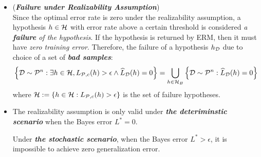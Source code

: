 \documentclass[11pt]{article}
\begin{document}
\begin{itemize}
\item \begin{remark} (\textbf{\emph{Failure under Realizability Assumption}})\\
Since the optimal error rate is zero under the realizability assumption, a hypothesis $h \in {\mathcal H}$ with error rate above a certain threshold is considered \emph{a \textbf{failure} of the hypothesis}. If the hypothesis is returned by ERM, then it must have \emph{zero training error}. Therefore, the failure of a hypothesis $h_{{\mathcal D}}$ due to choice of a set of \emph{\textbf{bad samples}}: 
\begin{align*}
\left\{{\mathcal D} \sim {\mathcal P}^{n}: \exists h \in {\mathcal H},   L_{{\mathcal P}, c}(h) > \epsilon \land \widehat{L}_{{\mathcal D}}(h) = 0\right\} = \bigcup_{h \in {\mathcal H}_B}\left\{{\mathcal D} \sim {\mathcal P}^{n}: \widehat{L}_{{\mathcal D}}(h) = 0\right\}
\end{align*} where ${\mathcal H} := \left\{h\in {\mathcal H}:  L_{{\mathcal P}, c}(h) > \epsilon\right\}$ is the set of failure hypotheses.
\end{remark}

\item \begin{remark}
The realizability assumption is only valid under \emph{\textbf{the deteriminstic scenario}} when the Bayes error $L^{*} = 0$.

Under \emph{\textbf{the stochastic scenario}}, when the Bayes error $L^{*} > \epsilon$, it is impossible to achieve zero generalization error.

\end{remark}
\end{itemize}
\end{document}
